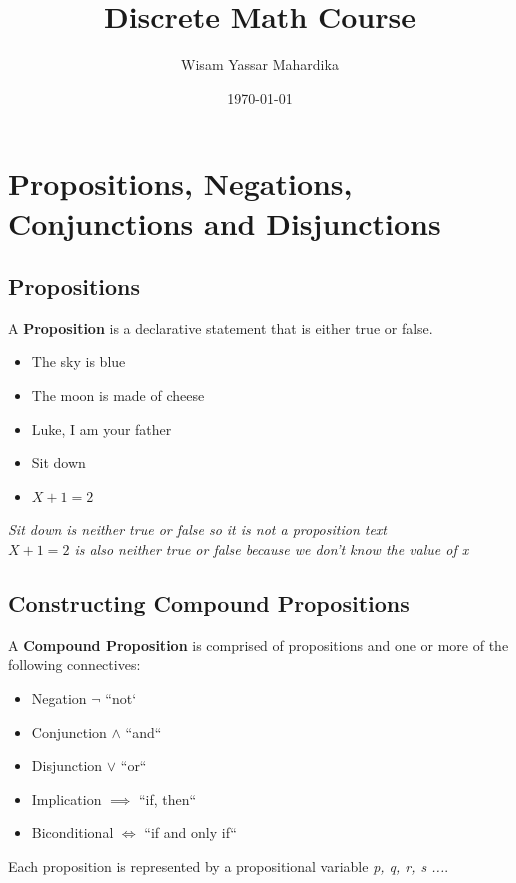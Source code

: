 \documentclass{article}
\title{Discrete Math Course}
\author{Wisam Yassar Mahardika}
\date{\today}
\begin{document}
\maketitle
\clearpage
\tableofcontents
\clearpage
\section{Propositions, Negations, Conjunctions and Disjunctions}
\subsection{Propositions}
A \textbf{Proposition} is a declarative statement that is either true or false.
\begin{itemize}
\item The sky is blue
\item The moon is made of cheese
\item Luke, I am your father
\item Sit down
\item $ X + 1 = 2 $ \\
\end{itemize}

 \textit{Sit down is neither true or false so it is not a proposition text} \\
\textit{$ X + 1 = 2 $ is also neither true or false because we don't know the value of x}
\\

\subsection{Constructing Compound Propositions}
A \textbf{Compound Proposition} is comprised of propositions and one or more of the following connectives:
\\


\begin{itemize}
\item Negation $ \neg $ ``not`
\item Conjunction $ \land $     ``and``
\item Disjunction $ \lor $ ``or``
\item Implication $ \implies $ ``if, then``
\item Biconditional $ \Longleftrightarrow{} $ ``if and only if``\\
\end{itemize}

Each proposition is represented by a propositional variable \textit{p, q, r, s ...}.\\
\end{document}
